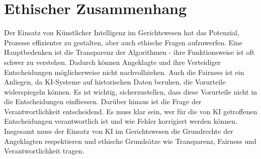 \documentclass{article}
\begin{document}
\section {Ethischer Zusammenhang}
Der Einsatz von Künstlicher Intelligenz im Gerichtswesen hat das Potenzial, Prozesse effizienter zu gestalten, aber 
auch ethische Fragen aufzuwerfen. Eine Hauptbedenken ist die Transparenz der Algorithmen - ihre Funktionsweise 
ist oft schwer zu verstehen. Dadurch können Angeklagte und ihre Verteidiger Entscheidungen möglicherweise nicht nachvollziehen. 
Auch die Fairness ist ein Anliegen, da KI-Systeme auf historischen Daten beruhen, die Vorurteile widerspiegeln können. Es ist wichtig, 
sicherzustellen, dass diese Vorurteile nicht in die Entscheidungen einfliessen. Darüber hinaus ist die Frage der Verantwortlichkeit entscheidend. 
Es muss klar sein, wer für die von KI getroffenen Entscheidungen verantwortlich ist und wie Fehler korrigiert werden können. 
Insgesamt muss der Einsatz von KI im Gerichtswesen die Grundrechte der Angeklagten respektieren und ethische Grundsätze wie Transparenz, 
Fairness und Verantwortlichkeit tragen. 






\newpage 
\printbibliography
\end{document}
